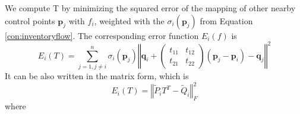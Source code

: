 \documentclass[12pt]{article}
\begin{document}
We compute T by minimizing the squared error of the mapping of other nearby control points $\mathbf{p}_j$ with $f_i$, weighted with the $\sigma_i(\mathbf{p}_j)$ from Equation \eqref{con:inventoryflow}. The corresponding error function $E_i(f)$ is
\begin{equation}
    E_i(T)=\sum_{j=1,j\neq i}^n\sigma_i(\mathbf{p}_j)\left\Vert\mathbf{q}_i+\left(
    \begin{array}{cc}
        t_{11} & t_{12} \\
        t_{21} & t_{22}
    \end{array}\right)(\mathbf{p}_j-\mathbf{p}_i)-\mathbf{q}_j\right\Vert^2
\end{equation}
It can be also written in the matrix form, which is
\begin{equation}
    E_i(T)=\left\Vert \tilde{P}_i T^T-\tilde{Q}_i \right\Vert_F^2
\end{equation}
where
\end{document}
